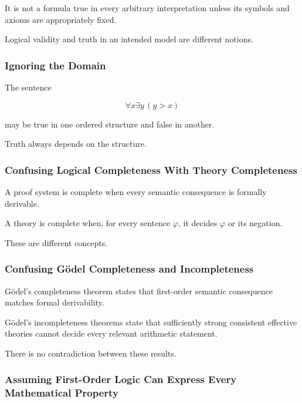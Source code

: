 It is not a formula true in every arbitrary interpretation unless its
symbols and axioms are appropriately fixed.

Logical validity and truth in an intended model are different notions.

\subsubsection{Ignoring the Domain}

The sentence

\[
\forall x\exists y\,(y>x)
\]

may be true in one ordered structure and false in another.

Truth always depends on the structure.

\subsubsection{Confusing Logical Completeness With Theory Completeness}

A proof system is complete when every semantic consequence is formally
derivable.

A theory is complete when, for every sentence \(\varphi\), it decides
\(\varphi\) or its negation.

These are different concepts.

\subsubsection{Confusing Gödel Completeness and Incompleteness}

Gödel's completeness theorem states that first-order semantic consequence
matches formal derivability.

Gödel's incompleteness theorems state that sufficiently strong consistent
effective theories cannot decide every relevant arithmetic statement.

There is no contradiction between these results.

\subsubsection{Assuming First-Order Logic Can Express Every Mathematical Property}

